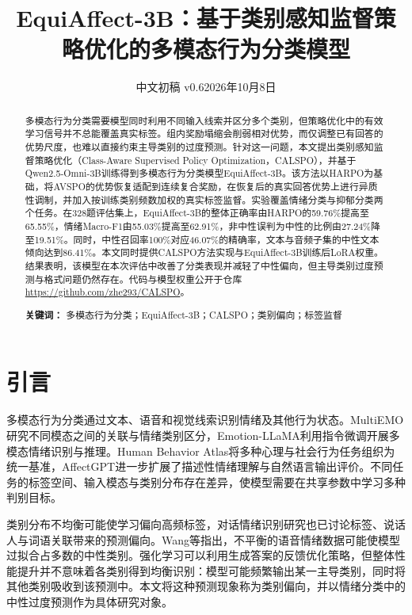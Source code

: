 \documentclass[UTF8,a4paper,11pt,fontset=windows]{ctexart}
\title{EquiAffect-3B：基于类别感知监督策略优化的多模态行为分类模型}
\author{}
\date{中文初稿 v0.6\quad 2026年10月8日}
\begin{document}
\maketitle

\begin{abstract}

多模态行为分类需要模型同时利用不同输入线索并区分多个类别，但策略优化中的有效学习信号并不总能覆盖真实标签。组内奖励塌缩会削弱相对优势，而仅调整已有回答的优势尺度，也难以直接约束主导类别的过度预测。针对这一问题，本文提出类别感知监督策略优化（Class-Aware Supervised Policy Optimization，CALSPO），并基于Qwen2.5-Omni-3B训练得到多模态行为分类模型EquiAffect-3B。该方法以HARPO为基础，将AVSPO的优势恢复适配到连续复合奖励，在恢复后的真实回答优势上进行异质性调制，并加入按训练类别频数加权的真实标签监督。实验覆盖情绪分类与抑郁分类两个任务。在328题评估集上，EquiAffect-3B的整体正确率由HARPO的59.76\%提高至65.55\%，情绪Macro-F1由55.03\%提高至62.91\%，非中性误判为中性的比例由27.24\%降至19.51\%。同时，中性召回率100\%对应46.07\%的精确率，文本与音频子集的中性文本倾向达到86.41\%。本文同时提供CALSPO方法实现与EquiAffect-3B训练后LoRA权重。结果表明，该模型在本次评估中改善了分类表现并减轻了中性偏向，但主导类别过度预测与格式问题仍然存在。代码与模型权重公开于仓库\url{https://github.com/zhe293/CALSPO}。

\par\medskip\noindent \textbf{关键词：} 多模态行为分类；EquiAffect-3B；CALSPO；类别偏向；标签监督
\end{abstract}

\section{引言}

多模态行为分类通过文本、语音和视觉线索识别情绪及其他行为状态。MultiEMO研究不同模态之间的关联与情绪类别区分\cite{ref1}，Emotion-LLaMA利用指令微调开展多模态情绪识别与推理\cite{ref2}。Human Behavior Atlas将多种心理与社会行为任务组织为统一基准\cite{ref3}，AffectGPT进一步扩展了描述性情绪理解与自然语言输出评价\cite{ref4}。不同任务的标签空间、输入模态与类别分布存在差异，使模型需要在共享参数中学习多种判别目标。

类别分布不均衡可能使学习偏向高频标签\cite{ref5}，对话情绪识别研究也已讨论标签、说话人与词语关联带来的预测偏向\cite{ref6}。Wang等指出，不平衡的语音情绪数据可能使模型过拟合占多数的中性类别\cite{ref25}。强化学习可以利用生成答案的反馈优化策略，但整体性能提升并不意味着各类别得到均衡识别：模型可能频繁输出某一主导类别，同时将其他类别吸收到该预测中。本文将这种预测现象称为类别偏向，并以情绪分类中的中性过度预测作为具体研究对象。
\end{document}
